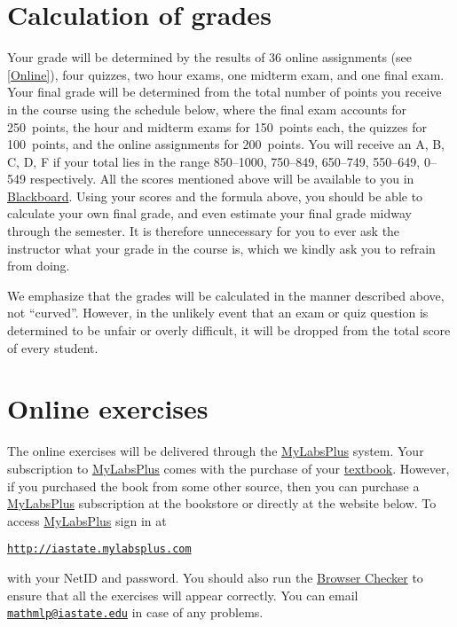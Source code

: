 \documentclass[11pt]{article}
\begin{document}
\section{Calculation of grades}\label{Assessment}
Your grade will be determined by the results of 
36 online assignments (see \autoref{Online}),
four quizzes, two hour exams, one midterm exam, and one 
final exam.
Your final grade will be determined from the total
number of points you receive in the course using the schedule below,
where the final exam accounts for 250~points,
the hour and midterm exams for 150~points each,
the quizzes for 100~points,
and the online assignments for 200~points.
You will receive an A, B, C, D, F if your total lies in the range
850--1000, 750--849, 650--749, 550--649, 0--549 respectively.
All the scores mentioned above will be available to you in
\href{https://bb.its.iastate.edu}{Blackboard}. Using your scores
and the formula above, you should be able to calculate your own final grade,
and even estimate your final grade midway through the semester.
It is therefore unnecessary for you to ever ask the instructor
what your grade in the course is, which we kindly ask you to refrain from
doing.

We emphasize that the grades will be calculated in the manner described
above, not ``curved''.
However, in the unlikely event that an exam or quiz question is determined
to be unfair or overly difficult, it will be dropped from the total score of
every student.

\section{Online exercises}\label{Online}
The online exercises will be delivered through the
\href{http://iastate.mylabsplus.com}{MyLabsPlus} system.
Your subscription to 
\href{http://iastate.mylabsplus.com}{MyLabsPlus}
comes with the purchase of your
\href{http://wps.aw.com/aw_thomas_calculus_series}{textbook}.
However, if you purchased the book from some other source,
then you can purchase a 
\href{http://iastate.mylabsplus.com}{MyLabsPlus}
subscription at the bookstore or directly at the website below.
To access
\href{http://iastate.mylabsplus.com}{MyLabsPlus}
sign in at
\begin{center}
\href{http://iastate.mylabsplus.com}{\tt http://iastate.mylabsplus.com}
\end{center}
with your NetID and password.
You should also run the
\href{https://www.mathxl.com/BrowserCheck/BrowserCheck.aspx?appproductid=3&courseid=2744761&handler_urn=pearson%2fmlp_mml_xl%2fslink%2fx-pearson-mlp_mml_xl&productid=ccng}{Browser Checker}
to ensure that all the exercises will appear correctly.
You can email \href{mailto://mathmlp@iastate.edu}{\tt mathmlp@iastate.edu}
in case of any problems.
\end{document}
